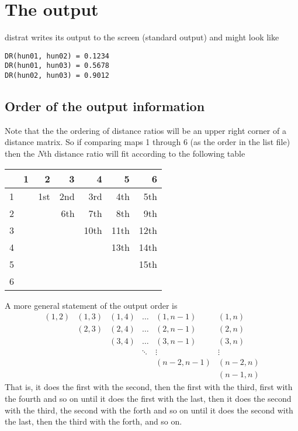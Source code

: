 \documentclass[%
	11pt,
        a4paper,
        twoside]{workrep}
\newcommand*{\prg}[1]{\textsf{#1}}		%
\begin{document}
\section{The output}\label{sec:drout}

\prg{distrat} writes its output to the screen (standard output) and
might look like
\begin{verbatim}
DR(hun01, hun02) = 0.1234
DR(hun01, hun03) = 0.5678
DR(hun02, hun03) = 0.9012
\end{verbatim}

\subsection{Order of the output information}

Note that the the ordering of distance ratios will be an upper right
corner of a distance matrix.  So if comparing maps 1 through 6 (as
the order in the list file) then the $N$th distance ratio will fit
according to the following table

\begin{center}
\begin{tabular}{l|rrrrrr}
  &   1 &   2 &   3 &    4 &    5 &    6\\
\hline
1 &     & 1st & 2nd &  3rd &  4th & 5th\\
2 &     &     & 6th &  7th &  8th & 9th\\
3 &     &     &     & 10th & 11th & 12th\\
4 &     &     &     &      & 13th & 14th\\		
5 &     &     &     &      &      & 15th\\
6 &     &     &     &      &      &
\end{tabular}
\end{center}

A more general statement of the output order is
\[
\begin{array}{cccccc}
(1, 2)& (1, 3) & (1, 4) & \ldots & (1,n-1)    &  (1, n)\\
      & (2, 3) & (2, 4) & \ldots & (2,n-1)    &  (2, n)\\
      &        & (3, 4) & \ldots & (3,n-1)    &  (3, n)\\
      &        &        & \ddots & \vdots     & \vdots\\
      &        &        &        & (n-2, n-1) & (n-2, n)\\
      &        &        &        &            & (n-1, n)
\end{array}
\]
That is, it does the first with the second, then the first with the third,
first with the fourth and so on until it does the first with the last, then
it does the second with the third, the second with the forth and so on
until it does the second with the last, then the third with the forth, and
so on.
\end{document}
